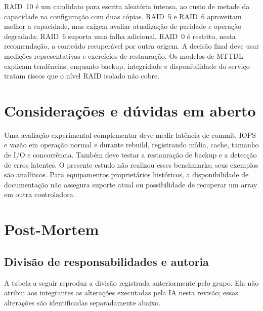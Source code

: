 \documentclass[titlepage]{article}
\begin{document}
RAID~10 é um candidato para escrita aleatória intensa, ao custo de metade da capacidade na configuração com duas cópias. RAID~5 e RAID~6 aproveitam melhor a capacidade, mas exigem avaliar atualização de paridade e operação degradada; RAID~6 suporta uma falha adicional. RAID~0 é restrito, nesta recomendação, a conteúdo recuperável por outra origem. A decisão final deve usar medições representativas e exercícios de restauração. Os modelos de MTTDL explicam tendências, enquanto backup, integridade e disponibilidade do serviço tratam riscos que o nível RAID isolado não cobre.

\section{Considerações e dúvidas em aberto}
Uma avaliação experimental complementar deve medir latência de commit, IOPS e vazão em operação normal e durante rebuild, registrando mídia, cache, tamanho de I/O e concorrência. Também deve testar a restauração de backup e a detecção de erros latentes. O presente estudo não realizou esses benchmarks; seus exemplos são analíticos. Para equipamentos proprietários históricos, a disponibilidade de documentação não assegura suporte atual ou possibilidade de recuperar um array em outra controladora.

\section{Post-Mortem}
\label{sec:postmortem}

\subsection{Divisão de responsabilidades e autoria}
A tabela a seguir reproduz a divisão registrada anteriormente pelo grupo. Ela não atribui aos integrantes as alterações executadas pela IA nesta revisão; essas alterações são identificadas separadamente abaixo.
\end{document}

